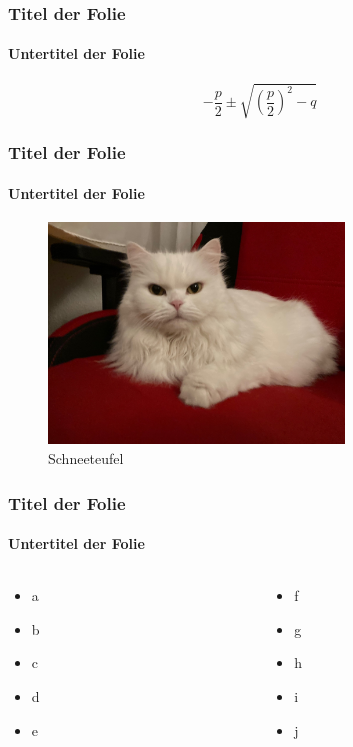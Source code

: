 \documentclass[ngerman]{beamer}
\begin{document}
\begin{frame}
\frametitle{Titel der Folie}
\framesubtitle{Untertitel der Folie}

\begin{equation}
-\frac{p}{2} \pm 
\sqrt{ 
 \left(
    \frac{p}{2}
 \right)^2 -q 
}
\end{equation}

\end{frame}


\begin{frame}
\frametitle{Titel der Folie}
\framesubtitle{Untertitel der Folie}

\begin{figure}
\begin{center}
\includegraphics[width=0.7\textwidth]{./Bilder/Katze.jpg}
\caption{Schneeteufel}
\end{center}
\end{figure}

\end{frame}


\begin{frame}
\frametitle{Titel der Folie}
\framesubtitle{Untertitel der Folie}

\begin{columns}
\begin{column}{0.495\textwidth}
\begin{itemize}
\item a
\item b
\item c
\item d
\item e
\end{itemize}
\end{column}
\begin{column}{0.495\textwidth}
\begin{itemize}
\item f
\item g
\item h
\item i
\item j
\end{itemize}
\end{column}
\end{columns}

\end{frame}
\end{document}
